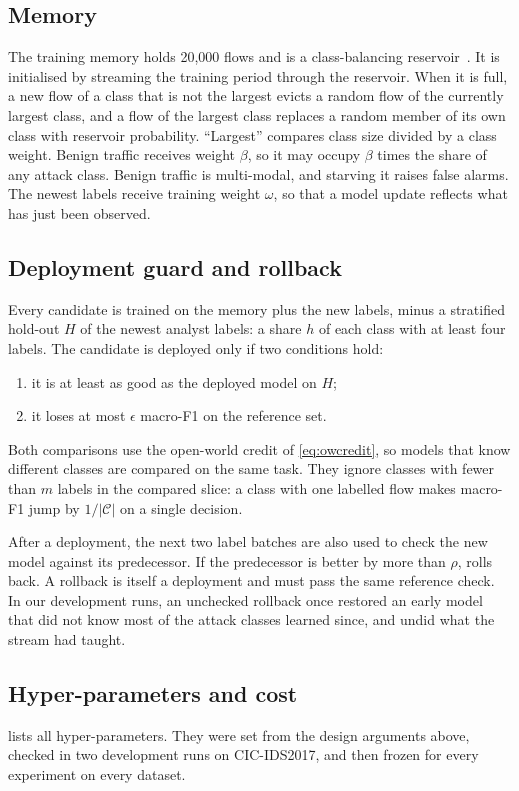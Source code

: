 \subsection{Memory}
\label{sec:memory}
The training memory holds 20{,}000 flows and is a class-balancing reservoir~\cite{chrysakis2020online}. It is
initialised by streaming the training period through the reservoir. When it is full, a new flow of a class that is not the largest evicts
a random flow of the currently largest class, and a flow of the largest class replaces a random member of its
own class with reservoir probability. ``Largest'' compares class size divided by a class weight. Benign traffic
receives weight $\beta$, so it may occupy $\beta$ times the share of any attack class. Benign traffic is
multi-modal, and starving it raises false alarms. The newest labels receive training weight $\omega$, so that a
model update reflects what has just been observed.

\subsection{Deployment guard and rollback}
\label{sec:guard}
Every candidate is trained on the memory plus the new labels, minus a stratified hold-out $H$ of the newest
analyst labels: a share $h$ of each class with at least four labels. The candidate is deployed only if two
conditions hold:
\begin{enumerate}
  \item it is at least as good as the deployed model on $H$;
  \item it loses at most $\epsilon$ macro-F1 on the reference set.
\end{enumerate}
Both comparisons use the open-world credit of \cref{eq:owcredit}, so models that know different classes are
compared on the same task. They ignore classes with fewer than $m$ labels in the compared slice: a class with one
labelled flow makes macro-F1 jump by $1/|\mathcal{C}|$ on a single decision.

After a deployment, the next two label batches are also used to check the new model against its predecessor. If
the predecessor is better by more than $\rho$, \nova{} rolls back. A rollback is itself a deployment and must pass
the same reference check. In our development runs, an unchecked rollback once restored an early model that did not
know most of the attack classes learned since, and undid what the stream had taught.

\subsection{Hyper-parameters and cost}
 lists all hyper-parameters. They were set from the design arguments above, checked in two
development runs on CIC-IDS2017, and then frozen for every experiment on every dataset.

